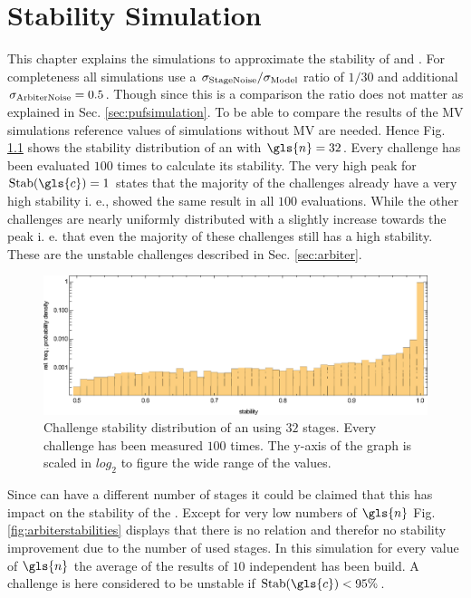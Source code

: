 \chapter{Stability Simulation}
\label{cap:stabilitysimulation}

This chapter explains the simulations to approximate the stability of \mpufs and \mxpufs.
For completeness all simulations use a $\sigma_{\mathrm{Stage Noise}}/\sigma_{\mathrm{Model}}$ ratio of $1/30$ and additional $\sigma_{\mathrm{Arbiter Noise}} = 0.5$.
Though since this is a comparison the ratio does not matter as explained in Sec. \ref{sec:pufsimulation}.
To be able to compare the results of the \ac{MV} simulations reference values of \apufs simulations without \ac{MV} are needed.
Hence Fig. \ref{fig:arbiterstabilitydistribution} shows the stability distribution of an \apuf with $\gls{n} = 32$.
Every challenge has been evaluated $100$ times to calculate its stability.
The very high peak for $\Stab(\gls{c}) = 1$ states that the majority of the challenges already have a very high stability i. e., showed the same result in all $100$ evaluations.
While the other challenges are nearly uniformly distributed with a slightly increase towards the peak i. e. that even the majority of these challenges still has a high stability.
These are the unstable challenges described in Sec. \ref{sec:arbiter}.

\begin{figure}[ht]
\includegraphics[width=1.00\textwidth]{images/arbiter-stability-distribution-simulation.eps}
\caption[Challenge stability distribution of an \apuf]{Challenge stability distribution of an \apuf using $32$ stages. Every challenge has been measured $100$ times. The y-axis of the graph is scaled in $log_2$ to figure the wide range of the values.} 
\label{fig:arbiterstabilitydistribution}
\end{figure}

Since \apufs can have a different number of stages it could be claimed that this has impact on the stability of the \puf.
Except for very low numbers of $\gls{n}$ Fig. \ref{fig:arbiterstabilities} displays that there is no relation and therefor no stability improvement due to the number of used stages. %
In this simulation for every value of $\gls{n}$ the average of the results of $10$ independent \apufs has been build.
A challenge is here considered to be unstable if $\Stab(\gls{c}) < 95 \%$.

